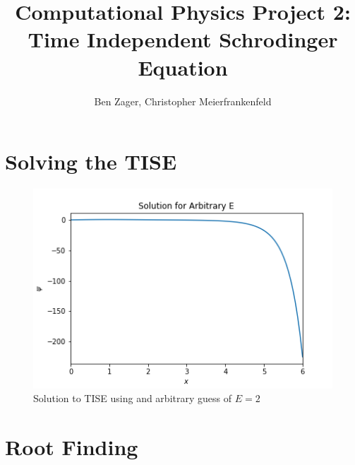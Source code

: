 \documentclass[12pt]{article}
\begin{document}
  
\title{Computational Physics Project 2: Time Independent Schrodinger Equation}
\author{Ben Zager, Christopher Meierfrankenfeld}
\maketitle
 
\section*{Solving the TISE}

\begin{figure}[ht!]
	\centering
	\includegraphics[scale=0.6]{../figures/guessPlot_L=6_E=2.png}
	\caption{Solution to TISE using and arbitrary guess of $E=2$}
	\label{guess}
\end{figure}

\section*{Root Finding}
\end{document}
